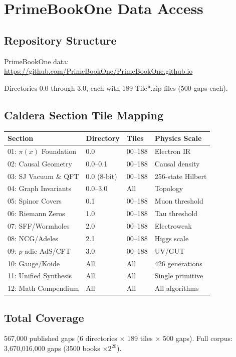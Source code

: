 \chapter{PrimeBookOne Data Access}
\label{app:data}

\section{Repository Structure}
PrimeBookOne data: \url{https://github.com/PrimeBookOne/PrimeBookOne.github.io}

Directories 0.0 through 3.0, each with 189 Tile*.zip files (500 gaps each).

\section{Caldera Section Tile Mapping}
\begin{longtable}{llll}
\toprule
\textbf{Section} & \textbf{Directory} & \textbf{Tiles} & \textbf{Physics Scale} \\
\midrule
01: $\pi(x)$ Foundation & 0.0 & 00--188 & Electron IR \\
02: Causal Geometry & 0.0--0.1 & 00--188 & Causal density \\
03: SJ Vacuum \& QFT & 0.0 (8-bit) & 00--188 & 256-state Hilbert \\
04: Graph Invariants & 0.0--3.0 & All & Topology \\
05: Spinor Covers & 0.1 & 00--188 & Muon threshold \\
06: Riemann Zeros & 1.0 & 00--188 & Tau threshold \\
07: SFF/Wormholes & 2.0 & 00--188 & Electroweak \\
08: NCG/Adeles & 2.1 & 00--188 & Higgs scale \\
09: $p$-adic AdS/CFT & 3.0 & 00--188 & UV/GUT \\
10: Gauge/Koide & All & All & 426 generations \\
11: Unified Synthesis & All & All & Single primitive \\
12: Math Compendium & All & All & All algorithms \\
\bottomrule
\end{longtable}

\section{Total Coverage}
567,000 published gaps (6 directories $\times$ 189 tiles $\times$ 500 gaps).
Full corpus: 3,670,016,000 gaps (3500 books $\times 2^{20}$).
